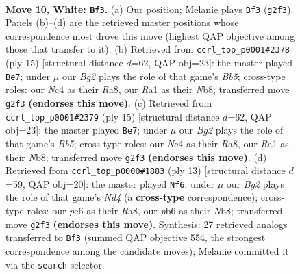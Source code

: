 \documentclass[11pt]{article}
\begin{document}
\clearpage

\begin{figure}[p]\centering
\begin{subfigure}{0.46\textwidth}\centering
\resizebox{\linewidth}{!}{%
\newchessgame
\chessboard[
  setfen={rnbqr1k1/p1p1bppp/1p2p3/3n4/2NP4/3Q2P1/PP2PPBP/RNB2RK1 w - - 0 10},
  showmover=false,
  pgfstyle=straightmove, color=movearrow, markmove={g2-f3}
]}
\caption{}
\end{subfigure}\hfill
\begin{subfigure}{0.46\textwidth}\centering
\resizebox{\linewidth}{!}{%
\newchessgame
\chessboard[
  setfen={rnbq1rk1/ppp2pp1/4p2p/3n4/1b1P4/2NBPN2/PPQ2PPP/R1B1K2R b KQ - 1 8},
  showmover=false,
  pgfstyle=straightmove, color=movearrow, markmove={b4-e7}
]}
\caption{}
\end{subfigure}
\\[4pt]
\begin{subfigure}{0.46\textwidth}\centering
\resizebox{\linewidth}{!}{%
\newchessgame
\chessboard[
  setfen={rnbq1rk1/ppp2pp1/4p2p/3n4/1b1P4/2NBPN2/PPQ2PPP/R1B1K2R b KQ - 1 8},
  showmover=false,
  pgfstyle=straightmove, color=movearrow, markmove={b4-e7}
]}
\caption{}
\end{subfigure}\hfill
\begin{subfigure}{0.46\textwidth}\centering
\resizebox{\linewidth}{!}{%
\newchessgame
\chessboard[
  setfen={rn1qkb1r/pbp2ppp/1p2p3/3n4/3P4/P1N1PN2/1P3PPP/R1BQKB1R b KQkq - 0 7},
  showmover=false,
  pgfstyle=straightmove, color=movearrow, markmove={d5-f6}
]}
\caption{}
\end{subfigure}
\caption{\textbf{Move 10, White: \texttt{Bf3}.} (a) Our position; Melanie plays \texttt{Bf3} (\texttt{g2f3}). Panels (b)--(d) are the retrieved master positions whose correspondence most drove this move (highest QAP objective among those that transfer to it). (b) Retrieved from \texttt{ccrl\_top\_p0001\#2378} (ply 15) [structural distance $d$=62, QAP obj=23]: the master played \texttt{Be7}; under $\mu$ our \emph{Bg2} plays the role of that game's \emph{Bb5}; cross-type roles: our \emph{N}c4 as their \emph{R}a8, our \emph{R}a1 as their \emph{N}b8; transferred move \texttt{g2f3} \textbf{(endorses this move)}. (c) Retrieved from \texttt{ccrl\_top\_p0001\#2379} (ply 15) [structural distance $d$=62, QAP obj=23]: the master played \texttt{Be7}; under $\mu$ our \emph{Bg2} plays the role of that game's \emph{Bb5}; cross-type roles: our \emph{N}c4 as their \emph{R}a8, our \emph{R}a1 as their \emph{N}b8; transferred move \texttt{g2f3} \textbf{(endorses this move)}. (d) Retrieved from \texttt{ccrl\_top\_p0000\#1883} (ply 13) [structural distance $d$=59, QAP obj=20]: the master played \texttt{Nf6}; under $\mu$ our \emph{Bg2} plays the role of that game's \emph{Nd4} (a \textbf{cross-type} correspondence); cross-type roles: our \emph{p}e6 as their \emph{R}a8, our \emph{p}b6 as their \emph{N}b8; transferred move \texttt{g2f3} \textbf{(endorses this move)}. Synthesis: 27 retrieved analogs transferred to \texttt{Bf3} (summed QAP objective 554, the strongest correspondence among the candidate moves); Melanie committed it via the \texttt{search} selector.}
\label{fig:thought-m18}
\end{figure}
\end{document}
